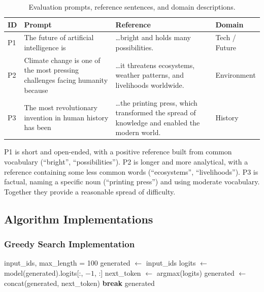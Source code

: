 \documentclass[12pt]{article}
\begin{document}
\begin{table}[ht]
	\centering
	\caption{Evaluation prompts, reference sentences, and domain descriptions.}
	\label{tab:prompts}
	\small
	\begin{tabularx}{\linewidth}{|l|X|X|l|}
		\hline
		\textbf{ID} & \textbf{Prompt} & \textbf{Reference} & \textbf{Domain} \\ \hline
		P1 & The future of artificial intelligence is & \dots bright and holds many possibilities. & Tech / Future \\ \hline
		P2 & Climate change is one of the most pressing challenges facing humanity because & \dots it threatens ecosystems, weather patterns, and livelihoods worldwide. & Environment \\ \hline
		P3 & The most revolutionary invention in human history has been & \dots the printing press, which transformed the spread of knowledge and enabled the modern world. & History \\ \hline
	\end{tabularx}
\end{table}
	
	P1 is short and open-ended, with a positive reference built from common vocabulary (``bright'', ``possibilities''). P2 is longer and more analytical, with a reference containing some less common words (``ecosystems'', ``livelihoods''). P3 is factual, naming a specific noun (``printing press'') and using moderate vocabulary. Together they provide a reasonable spread of difficulty.
	
	\subsection{Algorithm Implementations}
	
	\subsubsection{Greedy Search Implementation}
	
	\begin{algorithm}[H]
		\caption{Greedy Search}
		\label{alg:greedy}
		\begin{algorithmic}[1]
			\Require input\_ids, max\_length = 100
			\State generated $\leftarrow$ input\_ids
			\State logits $\leftarrow$ model(generated).logits[:, $-1$, :]
			\State next\_token $\leftarrow$ argmax(logits)
			\State generated $\leftarrow$ concat(generated, next\_token)
			  \textbf{break}  \EndIf
			\EndWhile
			\Return generated
		\end{algorithmic}
	\end{algorithm}
	
\end{document}
